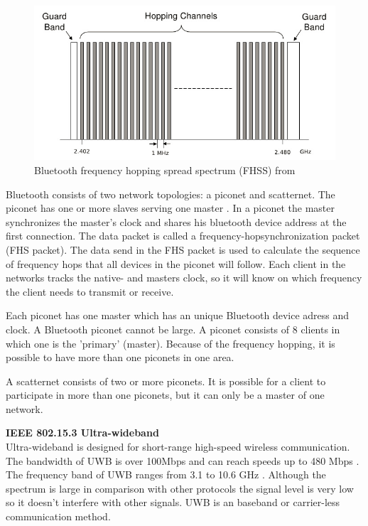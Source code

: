 \documentclass[10pt,a4paper]{article}
\begin{document}
\begin{figure}[H]
   \centering
   \includegraphics[width=1\textwidth]{bluetoothfh}
   \caption{Bluetooth frequency hopping spread spectrum (FHSS) from \cite{bluetoothspectrum}}
   \label{fig:bluetoothfh}
\end{figure}

Bluetooth consists of two network topologies: a piconet and scatternet. The piconet has one or more slaves serving one master \cite{bluetoothpiconet}. In a piconet the master synchronizes the master's clock and shares his bluetooth device address at the first connection. The data packet is called a frequency-hopsynchronization packet (FHS packet). The data send in the FHS packet is used to calculate the sequence of frequency hops that all devices in the piconet will follow. Each client in the networks tracks the native- and masters clock, so it will know on which frequency the client needs to transmit or receive.

Each piconet has one master which has an unique Bluetooth device adress and clock. A Bluetooth piconet cannot be large. A piconet consists of 8 clients in which one is the 'primary' (master).\cite{tcipbook} Because of the frequency hopping, it is possible to have more than one piconets in one area. 

A scatternet consists of two or more piconets. It is possible for a client to participate in more than one piconets, but it can only be a master of one network.

\textbf{\large IEEE 802.15.3 Ultra-wideband}\\
Ultra-wideband is designed for short-range high-speed wireless communication. The bandwidth of UWB is over 100Mbps and can reach speeds up to 480 Mbps \cite{comparitivestudywirelessprotocols}. The frequency band of UWB ranges from 3.1 to 10.6 GHz \cite{ultrawidebandwirelesscommunications}. Although the spectrum is large in comparison with other protocols the signal level is very low so it doesn't interfere with other signals. UWB is an baseband or carrier-less communication method.
\end{document}
